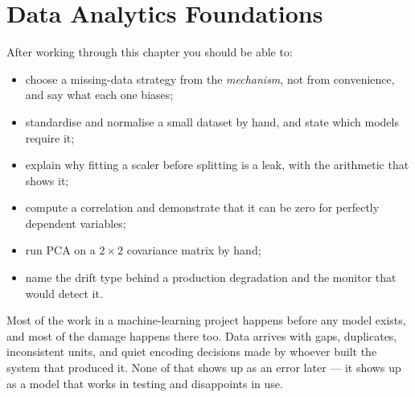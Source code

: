
\chapter{Data Analytics Foundations}


\label{ch:data-analytics}

\begin{learningobjectives}
After working through this chapter you should be able to:
\begin{itemize}
  \item choose a missing-data strategy from the \emph{mechanism}, not from
        convenience, and say what each one biases;
  \item standardise and normalise a small dataset by hand, and state which
        models require it;
  \item explain why fitting a scaler before splitting is a leak, with the
        arithmetic that shows it;
  \item compute a correlation and demonstrate that it can be zero for perfectly
        dependent variables;
  \item run PCA on a $2\times2$ covariance matrix by hand;
  \item name the drift type behind a production degradation and the monitor
        that would detect it.
\end{itemize}
\end{learningobjectives}

\begin{plainlanguage}
Most of the work in a machine-learning project happens before any model exists,
and most of the damage happens there too. Data arrives with gaps, duplicates,
inconsistent units, and quiet encoding decisions made by whoever built the
system that produced it. None of that shows up as an error later --- it shows up
as a model that works in testing and disappoints in use.
\end{plainlanguage}

